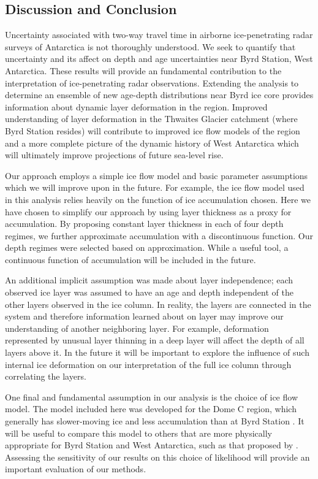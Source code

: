 \documentclass[jgrga]{agutex}
\begin{document}
\begin{article}
\section{Discussion and Conclusion}
Uncertainty associated with two-way travel time in airborne ice-penetrating radar surveys of Antarctica is not thoroughly understood. We seek to quantify that uncertainty and its affect on depth and age uncertainties near Byrd Station, West Antarctica. These results will provide an fundamental contribution to the interpretation of ice-penetrating radar observations. Extending the analysis to determine an ensemble of new age-depth distributions near Byrd ice core provides information about dynamic layer deformation in the region. Improved understanding of layer deformation in the Thwaites Glacier catchment (where Byrd Station resides) will contribute to improved ice flow models of the region and a more complete picture of the dynamic history of West Antarctica which will ultimately improve projections of future sea-level rise. 

Our approach employs a simple ice flow model and basic parameter assumptions which we will improve upon in the future. For example, the ice flow model used in this analysis relies heavily on the function of ice accumulation chosen. Here we have chosen to simplify our approach by using layer thickness as a proxy for accumulation. By proposing constant layer thickness in each of four depth regimes, we further approximate accumulation with a discontinuous function. Our depth regimes were selected based on \citet{who?} approximation. While a useful tool, a continuous function of accumulation will be included in the future.

An additional implicit assumption was made about layer independence; each observed ice layer was assumed to have an age and depth independent of the other layers observed in the ice column. In reality, the layers are connected in the system and therefore information learned about on layer may improve our understanding of another neighboring layer. For example, deformation represented by unusual layer thinning in a deep layer will affect the depth of all layers above it. In the future it will be important to explore the influence of such internal ice deformation on our interpretation of the full ice column through correlating the layers. 

One final and fundamental assumption in our analysis is the choice of ice flow model. The model included here was developed for the Dome C region, which generally has slower-moving ice and less accumulation than at Byrd Station \citep{who?}. It will be useful to compare this model to others that are more physically appropriate for Byrd Station and West Antarctica, such as that proposed by \citet{morland}. Assessing the sensitivity of our results on this choice of likelihood will provide an important evaluation of our methods.


\end{article}
\end{document}
